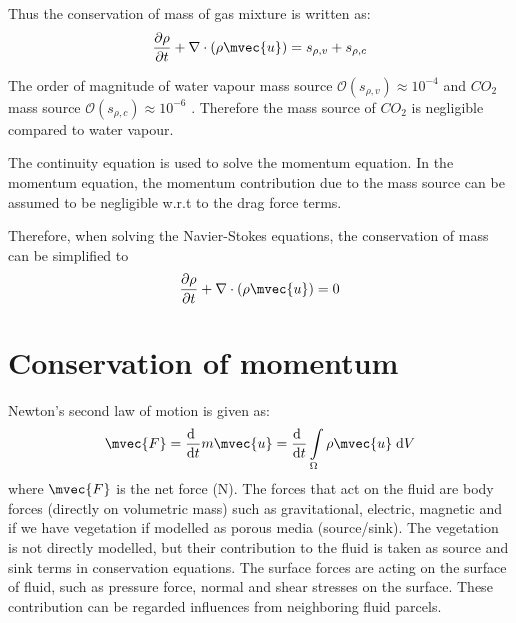Thus the conservation of mass of gas mixture is written as:
\begin{equation}
\frac{{\partial {\rho}}}{{\partial t}} + \nabla  \cdot \left( {{\rho }{\mvec{u}}} \right) = s_{\rho,v} + s_{\rho,c}
\end{equation}

\begin{assumption}
The order of magnitude of water vapour mass source $\mathcal{O}\left(s_{\rho,v}\right)\approx10^{-4}$ and $CO_2$ mass source $\mathcal{O}\left(s_{\rho,c}\right)\approx10^{-6}$ \citep{Hiraoka2005}. Therefore the mass source of $CO_2$ is negligible compared to water vapour.
\end{assumption}

\begin{assumption}
The continuity equation is used to solve the momentum equation. In the momentum equation, the momentum contribution due to the mass source can be assumed to be negligible w.r.t to the drag force terms.
\end{assumption}

Therefore, when solving the Navier-Stokes equations, the conservation of mass can be simplified to
\begin{equation}
\frac{{\partial {\rho}}}{{\partial t}} + \nabla  \cdot \left( {{\rho }{\mvec{u}}}\right) = 0
\end{equation}

\section{Conservation of momentum}

Newton's second law of motion is given as:
\begin{equation}
{\mvec{F}} = \frac{\mathrm{d}~}{{\mathrm{d}t}}m{\mvec{u}}=\frac{\mathrm{d}~}{{\mathrm{d}t}} \int \limits_\Omega  \rho {\mvec{u}}\;\mathrm{d}V
\end{equation}
where $\mvec{F}$ is the net force (N). The forces that act on the fluid are body forces (directly on volumetric mass) such as gravitational, electric, magnetic and if we have vegetation if modelled as porous media (source/sink). The vegetation is not directly modelled, but their contribution to the fluid is taken as source and sink terms in conservation equations. The surface forces are acting on the surface of fluid, such as pressure force, normal and shear stresses on the surface. These contribution can be regarded influences from neighboring fluid parcels.

